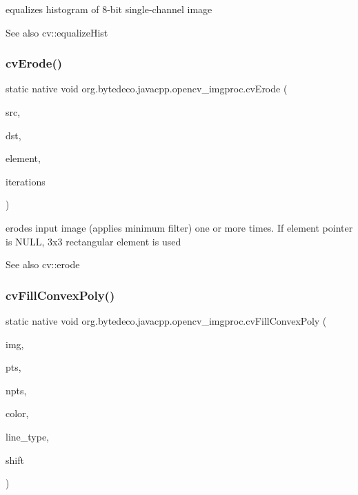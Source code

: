 equalizes histogram of 8-\/bit single-\/channel image 

\begin{DoxySeeAlso}{See also}
cv\+::equalize\+Hist 
\end{DoxySeeAlso}
\mbox{\label{group__imgproc__c_ga8b958e2b5185910eba9b44400bb1d3b8}} 
\subsubsection{\texorpdfstring{cv\+Erode()}{cvErode()}}
{\footnotesize\ttfamily static native void org.\+bytedeco.\+javacpp.\+opencv\+\_\+imgproc.\+cv\+Erode (\begin{DoxyParamCaption}\item[{@Const Cv\+Arr}]{src,  }\item[{Cv\+Arr}]{dst,  }\item[{Ipl\+Conv\+Kernel}]{element,  }\item[{int}]{iterations }\end{DoxyParamCaption})\hspace{0.3cm}{\ttfamily [static]}}



erodes input image (applies minimum filter) one or more times. If element pointer is N\+U\+LL, 3x3 rectangular element is used 

\begin{DoxySeeAlso}{See also}
cv\+::erode 
\end{DoxySeeAlso}
\mbox{\label{group__imgproc__c_ga78d1444aef347e816876c749259ebcc2}} 
\subsubsection{\texorpdfstring{cv\+Fill\+Convex\+Poly()}{cvFillConvexPoly()}}
{\footnotesize\ttfamily static native void org.\+bytedeco.\+javacpp.\+opencv\+\_\+imgproc.\+cv\+Fill\+Convex\+Poly (\begin{DoxyParamCaption}\item[{Cv\+Arr}]{img,  }\item[{@Const Cv\+Point}]{pts,  }\item[{int}]{npts,  }\item[{@By\+Val Cv\+Scalar}]{color,  }\item[{int}]{line\+\_\+type,  }\item[{int}]{shift }\end{DoxyParamCaption})\hspace{0.3cm}{\ttfamily [static]}}



